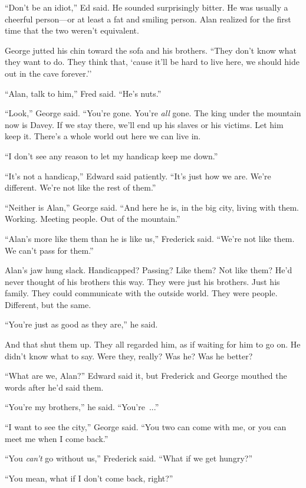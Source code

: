 ``Don't be an idiot,'' Ed said.  He sounded surprisingly bitter.  He
was usually a cheerful person---or at least a fat and smiling person. 
Alan realized for the first time that the two weren't equivalent.

George jutted his chin toward the sofa and his brothers.  ``They don't
know what they want to do.  They think that, `cause it'll be hard to
live here, we should hide out in the cave forever.''

``Alan, talk to him,'' Fred said.  ``He's nuts.''

``Look,'' George said.  ``You're gone.  You're \textit{all} gone.  The
king under the mountain now is Davey.  If we stay there, we'll end up
his slaves or his victims.  Let him keep it.  There's a whole world
out here we can live in.

``I don't see any reason to let my handicap keep me down.''

``It's not a handicap,'' Edward said patiently.  ``It's just how we
are.  We're different.  We're not like the rest of them.''

``Neither is Alan,'' George said.  ``And here he is, in the big city,
living with them.  Working.  Meeting people.  Out of the mountain.''

``Alan's more like them than he is like us,'' Frederick said.  ``We're
not like them.  We can't pass for them.''

Alan's jaw hung slack.  Handicapped?  Passing?  Like them?  Not like
them?  He'd never thought of his brothers this way.  They were just
his brothers.  Just his family.  They could communicate with the
outside world.  They were people.  Different, but the same.

``You're just as good as they are,'' he said.

And that shut them up.  They all regarded him, as if waiting for him
to go on.  He didn't know what to say.  Were they, really?  Was he? 
Was he better?

``What are we, Alan?'' Edward said it, but Frederick and George
mouthed the words after he'd said them.

``You're my brothers,'' he said.  ``You're~...''

``I want to see the city,'' George said.  ``You two can come with me,
or you can meet me when I come back.''

``You \textit{can't} go without us,'' Frederick said.  ``What if we
get hungry?''

``You mean, what if I don't come back, right?''

